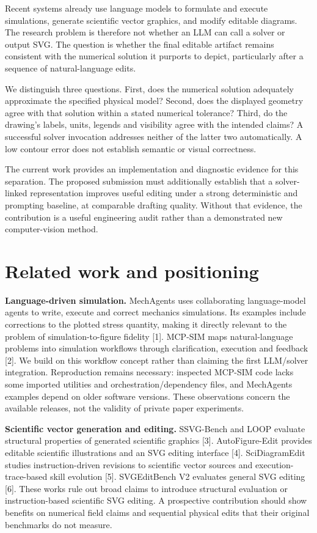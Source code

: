 \documentclass[
  11pt,
  a4paper,
]{article}
\begin{document}
Recent systems already use language models to formulate and execute
simulations, generate scientific vector graphics, and modify editable
diagrams. The research problem is therefore not whether an LLM can call
a solver or output SVG. The question is whether the final editable
artifact remains consistent with the numerical solution it purports to
depict, particularly after a sequence of natural-language edits.

We distinguish three questions. First, does the numerical solution
adequately approximate the specified physical model? Second, does the
displayed geometry agree with that solution within a stated numerical
tolerance? Third, do the drawing's labels, units, legends and visibility
agree with the intended claims? A successful solver invocation addresses
neither of the latter two automatically. A low contour error does not
establish semantic or visual correctness.

The current work provides an implementation and diagnostic evidence for
this separation. The proposed submission must additionally establish
that a solver-linked representation improves useful editing under a
strong deterministic and prompting baseline, at comparable drafting
quality. Without that evidence, the contribution is a useful engineering
audit rather than a demonstrated new computer-vision method.

\section{Related work and
positioning}\label{related-work-and-positioning}

\textbf{Language-driven simulation.} MechAgents uses collaborating
language-model agents to write, execute and correct mechanics
simulations. Its examples include corrections to the plotted stress
quantity, making it directly relevant to the problem of
simulation-to-figure fidelity {[}1{]}. MCP-SIM maps natural-language
problems into simulation workflows through clarification, execution and
feedback {[}2{]}. We build on this workflow concept rather than claiming
the first LLM/solver integration. Reproduction remains necessary:
inspected MCP-SIM code lacks some imported utilities and
orchestration/dependency files, and MechAgents examples depend on older
software versions. These observations concern the available releases,
not the validity of private paper experiments.

\textbf{Scientific vector generation and editing.} SSVG-Bench and LOOP
evaluate structural properties of generated scientific graphics {[}3{]}.
AutoFigure-Edit provides editable scientific illustrations and an SVG
editing interface {[}4{]}. SciDiagramEdit studies instruction-driven
revisions to scientific vector sources and execution-trace-based skill
evolution {[}5{]}. SVGEditBench V2 evaluates general SVG editing
{[}6{]}. These works rule out broad claims to introduce structural
evaluation or instruction-based scientific SVG editing. A prospective
contribution should show benefits on numerical field claims and
sequential physical edits that their original benchmarks do not measure.
\end{document}
